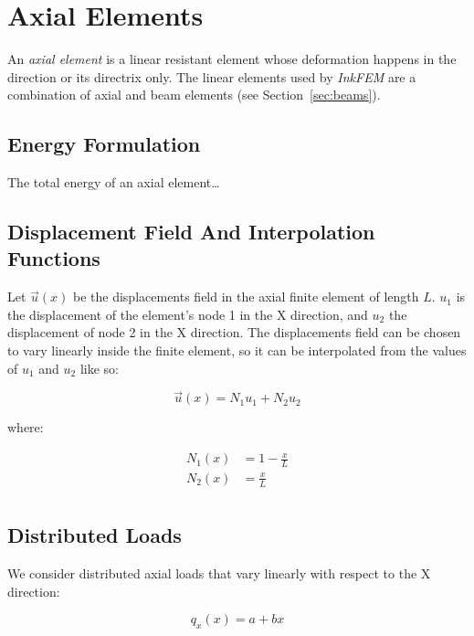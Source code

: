 \section{Axial Elements}
\label{sec:axial}

An \emph{axial element} is a linear resistant element whose deformation happens in the direction or its directrix only.
The linear elements used by \emph{InkFEM} are a combination of axial and beam elements (see Section~\ref{sec:beams}).


\subsection{Energy Formulation}

The total energy of an axial element\dots

\subsection{Displacement Field And Interpolation Functions}

Let $\vec{u}(x)$ be the displacements field in the axial finite element of length $L$.
$u_1$ is the displacement of the element's node 1 in the X direction, and $u_2$ the displacement of node 2 in the X direction.
The displacements field can be chosen to vary linearly inside the finite element, so it can be interpolated from the values of $u_1$ and $u_2$ like so:

\begin{equation}
  \vec{u}(x) = N_1 u_1 + N_2 u_2
\end{equation}

where:

\begin{equation}
  \begin{split}
    N_1(x) & = 1 - \frac{x}{L} \\
    N_2(x) & = \frac{x}{L} \\
  \end{split}
\end{equation}


\subsection{Distributed Loads}

We consider distributed axial loads that vary linearly with respect to the X direction:

\begin{equation}
  q_x(x) = a + bx
\end{equation}

